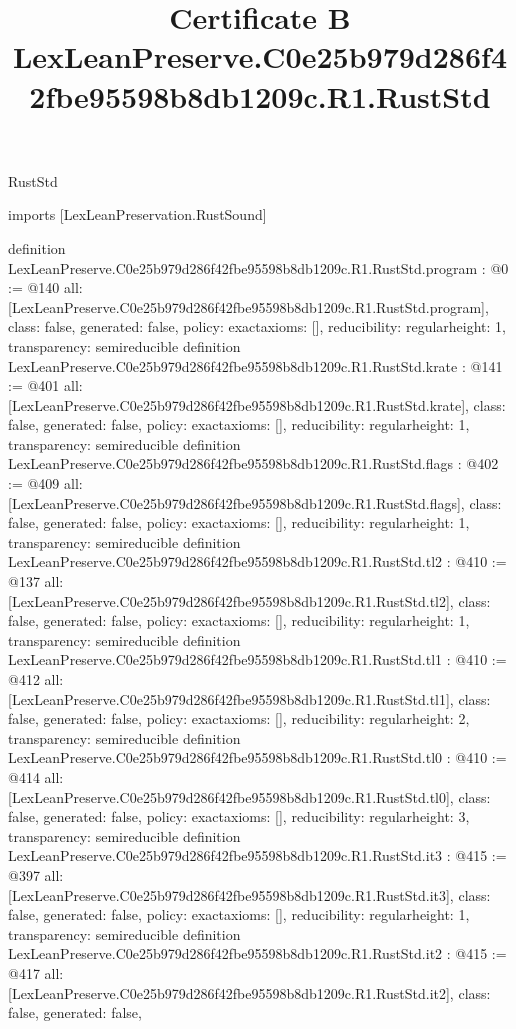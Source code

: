 \begin{lexlean}{RustStd}
\title{Certificate B LexLeanPreserve.C0e25b979d286f42fbe95598b8db1209c.R1.RustStd}
\begin{coremodule}
imports [LexLeanPreservation.RustSound]

definition LexLeanPreserve.C0e25b979d286f42fbe95598b8db1209c.R1.RustStd.program : @0 := @140 {
  all: [LexLeanPreserve.C0e25b979d286f42fbe95598b8db1209c.R1.RustStd.program],
  class: false,
  generated: false,
  policy: exact{axioms: []},
  reducibility: regular{height: 1},
  transparency: semireducible
}
definition LexLeanPreserve.C0e25b979d286f42fbe95598b8db1209c.R1.RustStd.krate : @141 := @401 {
  all: [LexLeanPreserve.C0e25b979d286f42fbe95598b8db1209c.R1.RustStd.krate],
  class: false,
  generated: false,
  policy: exact{axioms: []},
  reducibility: regular{height: 1},
  transparency: semireducible
}
definition LexLeanPreserve.C0e25b979d286f42fbe95598b8db1209c.R1.RustStd.flags : @402 := @409 {
  all: [LexLeanPreserve.C0e25b979d286f42fbe95598b8db1209c.R1.RustStd.flags],
  class: false,
  generated: false,
  policy: exact{axioms: []},
  reducibility: regular{height: 1},
  transparency: semireducible
}
definition LexLeanPreserve.C0e25b979d286f42fbe95598b8db1209c.R1.RustStd.tl2 : @410 := @137 {
  all: [LexLeanPreserve.C0e25b979d286f42fbe95598b8db1209c.R1.RustStd.tl2],
  class: false,
  generated: false,
  policy: exact{axioms: []},
  reducibility: regular{height: 1},
  transparency: semireducible
}
definition LexLeanPreserve.C0e25b979d286f42fbe95598b8db1209c.R1.RustStd.tl1 : @410 := @412 {
  all: [LexLeanPreserve.C0e25b979d286f42fbe95598b8db1209c.R1.RustStd.tl1],
  class: false,
  generated: false,
  policy: exact{axioms: []},
  reducibility: regular{height: 2},
  transparency: semireducible
}
definition LexLeanPreserve.C0e25b979d286f42fbe95598b8db1209c.R1.RustStd.tl0 : @410 := @414 {
  all: [LexLeanPreserve.C0e25b979d286f42fbe95598b8db1209c.R1.RustStd.tl0],
  class: false,
  generated: false,
  policy: exact{axioms: []},
  reducibility: regular{height: 3},
  transparency: semireducible
}
definition LexLeanPreserve.C0e25b979d286f42fbe95598b8db1209c.R1.RustStd.it3 : @415 := @397 {
  all: [LexLeanPreserve.C0e25b979d286f42fbe95598b8db1209c.R1.RustStd.it3],
  class: false,
  generated: false,
  policy: exact{axioms: []},
  reducibility: regular{height: 1},
  transparency: semireducible
}
definition LexLeanPreserve.C0e25b979d286f42fbe95598b8db1209c.R1.RustStd.it2 : @415 := @417 {
  all: [LexLeanPreserve.C0e25b979d286f42fbe95598b8db1209c.R1.RustStd.it2],
  class: false,
  generated: false,
}
\end{coremodule}
\end{lexlean}
